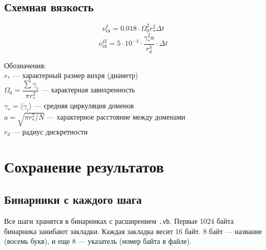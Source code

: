 \documentclass[14pt]{extreport}
\begin{document}
\subsection{Схемная вязкость}
\begin{equation*}
\nu_\text{сх}^I = 0.018 \cdot \Omega_0^2 r_*^2 \Delta t
\end{equation*}
\begin{equation*}
\nu_\text{сх}^{II} = 5\cdot10^{-4} \cdot \dfrac{\gamma_*^2 a}{r_d^3} \cdot \Delta t
\end{equation*}

Обозначения:\\
$r_*$ --- характерный размер вихря (диаметр)\\
$\Omega_0 = \dfrac{\sum\gamma_i}{\pi r_*^2}$ --- характерная завихренность\\
$\gamma_* = \langle \gamma_i \rangle$ --- средняя циркуляция доменов\\
$a = \sqrt{\pi r_*^2 / N} $ --- характерное расстояние между доменами\\
$r_d$ --- радиус дискретности\\

\newpage
\section{Сохранение результатов}

\subsection{Бинарники с каждого шага}
Все шаги хранятся в бинарниках с расширением \texttt{.vb}.
Первые 1024 байта бинарника занибают закладки.
Каждая закладка весит 16 байт.
8 байт --- название (восемь букв), и еще 8 --- указатель (номер байта в файле).
\end{document}
